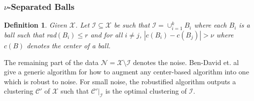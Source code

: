 \documentclass[twoside]{article}
\newcommand{\mc}{\mathcal}
\newtheorem{definition}[theorem]{Definition}
\begin{document}
\cite{ben2014clustering}


\subsubsection*{$\nu$-Separated Balls \cite{ben2014clustering}}
\begin{definition}
Given $\mc X$. Let $\mc I \subseteq \mc X$ be such that $\mc I = \cup_{i=1}^k B_i$ where each $B_i$ is a ball such that rad$(B_i) \le r$ and for all $i \neq j$, $|c(B_i)-c(B_j)| > \nu$ where $c(B)$ denotes the center of a ball.
\end{definition}
The remaining part of the data $\mc N = \mc X \setminus \mc I$ denotes the noise. Ben-David et. al \cite{ben2014clustering} give a generic algorithm for how to augment any center-based algorithm into one which is robust to noise. For small noise, the robustified algorithm outputs a clustering $\mc C'$ of $\mc X$ such that $\mc C'|_{\mc I}$ is the optimal clustering of $\mc I$.


\end{document}
